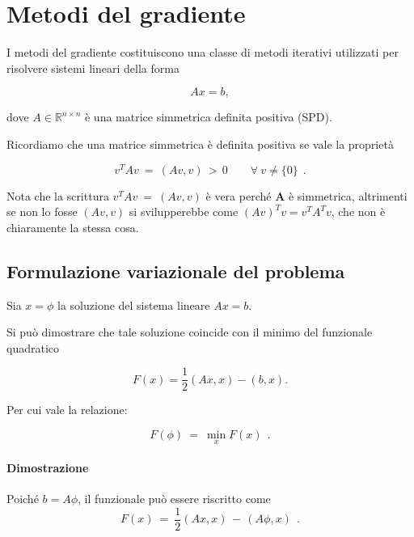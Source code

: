 \chapter{Metodi del gradiente}

I metodi del gradiente costituiscono una classe di metodi iterativi utilizzati per risolvere sistemi lineari della forma

\begin{equation*}
	A x = b,
\end{equation*}

dove $A \in \mathbb{R}^{n \times n}$ è una matrice simmetrica definita positiva (SPD).

Ricordiamo che una matrice simmetrica è definita positiva se vale la proprietà

\begin{equation*}
	v^T A v\ =\ (Av, v)\, >\, 0 \qquad \forall\ v \neq \{0\}\ \ .
\end{equation*}

Nota che la scrittura $v^T A v\ =\ (Av, v)$ è vera perché \textbf{A} è simmetrica, altrimenti se non lo fosse $(Av, v)$ si svilupperebbe come $(Av)^T v=v^T A^T v$, che non è chiaramente la stessa cosa.

\section{Formulazione variazionale del problema}

Sia $x = \phi$ la soluzione del sistema lineare $Ax = b$. 

Si può dimostrare che tale soluzione coincide con il minimo del funzionale quadratico

\begin{equation*}
	F(x) = \frac{1}{2}(Ax, x) - (b, x).
\end{equation*}

Per cui vale la relazione:

\begin{equation*}
	F(\phi)\ =\ \min_{x} F(x)\ \ .
\end{equation*}

\subsubsection{Dimostrazione}

Poiché $b = A\phi$, il funzionale può essere riscritto come
\begin{equation*}
	F(x)\ =\ \frac{1}{2}(Ax, x) \,-\, (A\phi, x)\ \ .
\end{equation*}

